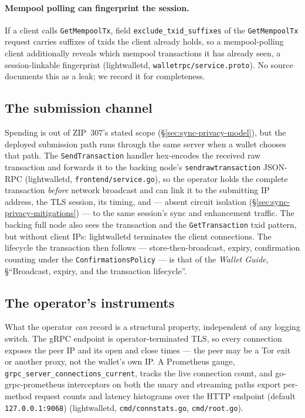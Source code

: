 \documentclass[11pt,a4paper]{article}
\theoremstyle{definition}
\begin{document}
\paragraph{Mempool polling can fingerprint the session.} If a client calls
\texttt{GetMempoolTx}, field
\texttt{exclude\_}\allowbreak\texttt{txid\_suffixes} of the
\texttt{GetMempool}\allowbreak\texttt{Tx} request
carries suffixes of txids the client already holds, so a mempool-polling
client additionally reveals which mempool transactions it has already
seen, a session-linkable fingerprint (\textsf{lightwalletd},
\texttt{walletrpc/service.proto}). No source documents this as a leak; we
record it for completeness.

\subsection{The submission channel}\label{sec:sync-privacy-submit}

Spending is out of ZIP~307's stated scope
(\S\ref{sec:sync-privacy-model}), but the deployed submission path runs
through the same server when a wallet chooses that path. The
\texttt{SendTransaction} handler hex-encodes
the received raw transaction and forwards it to the backing node's
\texttt{sendrawtransaction} JSON-RPC (\textsf{lightwalletd},
\texttt{frontend/service.go}), so the operator holds the complete
transaction \emph{before} network broadcast and can link it to the
submitting IP address, the TLS session, its timing, and --- absent circuit
isolation (\S\ref{sec:sync-privacy-mitigations}) --- to the same session's
sync and enhancement traffic. The backing full node also sees the
transaction and the \texttt{GetTransaction} txid pattern, but without
client IPs: \textsf{lightwalletd} terminates the client connections. The
lifecycle the transaction then follows --- store-then-broadcast, expiry,
confirmation counting under the \texttt{ConfirmationsPolicy} --- is that of
the \emph{Wallet Guide}, \S``Broadcast, expiry, and the transaction
lifecycle''.

\subsection{The operator's instruments}\label{sec:sync-privacy-operator}

What the operator \emph{can} record is a structural property, independent
of any logging switch. The gRPC endpoint is operator-terminated TLS, so
every connection exposes the peer IP and its open and close times ---
the peer may be a Tor exit or another proxy, not the wallet's own IP. A
Prometheus gauge, \texttt{grpc\_server\_connections\_current}, tracks the
live connection count, and go-grpc-prometheus interceptors on both the
unary and streaming paths export per-method request counts and latency
histograms over the HTTP endpoint (default \texttt{127.0.0.1:9068})
(\textsf{lightwalletd}, \texttt{cmd/connstats.go}, \texttt{cmd/root.go}).
\end{document}
